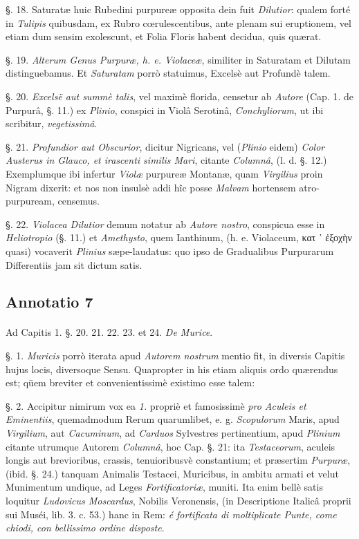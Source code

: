 \documentclass[a4paper, 11pt, oneside, polutonikogreek, german]{article}
\begin{document}
§. 18. Saturatæ huic Rubedini purpureæ opposita dein fuit \emph{Dilutior}: qualem forté in \emph{Tulipis} quibusdam, ex Rubro cœrulescentibus, ante plenam sui eruptionem, vel etiam dum sensim exolescunt, et Folia Floris habent decidua, quis quærat.

§. 19. \emph{Alterum Genus Purpuræ, h. e. Violaceæ}, similiter in Saturatam et Dilutam distinguebamus. Et \emph{Saturatam} porrò statuimus, Excelsè aut Profundè talem.

§. 20. \emph{Excelsë aut summè talis}, vel maximè florida, censetur ab \emph{Autore} (Cap. 1. de Purpurâ, §. 11.) ex \emph{Plinio}, conspici in Violâ Serotinâ, \emph{Conchyliorum}, ut ibi scribitur, \emph{vegetissimâ}.

§. 21. \emph{Profundior aut Obscurior}, dicitur Nigricans, vel (\emph{Plinio} eidem) \emph{Color Austerus in Glauco, et irascenti similis Mari}, citante \emph{Columnâ}, (l. d. §. 12.) Exemplumque ibi infertur \emph{Violæ} purpureæ Montanæ, quam \emph{Virgilius} proin Nigram dixerit: et nos non insulsè addi hîc posse \emph{Malvam} hortensem atro-purpuream, censemus.

§. 22. \emph{Violacea Dilutior} demum notatur ab \emph{Autore nostro}, conspicua esse in \emph{Heliotropio} (§. 11.) et \emph{Amethysto}, quem Ianthinum, (h. e. Violaceum, κατ ᾽ ἐξοχὴν quasi) vocaverit \emph{Plinius} sæpe-laudatus: quo ipso de Gradualibus Purpurarum Differentiis jam sit dictum satis.

\subsection{Annotatio 7}
\paragraph{}
Ad Capitis 1. §. 20. 21. 22. 23. et 24. \emph{De Murice}.

§. 1. \emph{Muricis} porrò iterata apud \emph{Autorem nostrum} mentio fit, in diversis Capitis hujus locis, diversoque Sensu. Quapropter in his etiam aliquis ordo quærendus est; qūem breviter et convenientissimè existimo esse talem:

§. 2. Accipitur nimirum vox ea \emph{1.} propriè et famosissimè \emph{pro Aculeis et Eminentiis}, quemadmodum Rerum quarumlibet, e. g. \emph{Scopulorum} Maris, apud \emph{Virgilium}, aut \emph{Cacuminum}, ad \emph{Carduos} Sylvestres pertinentium, apud \emph{Plinium} citante utrumque Autorem \emph{Columnâ}, hoc Cap. §. 21: ita \emph{Testaceorum}, aculeis longis aut brevioribus, crassis, tenuioribusvè constantium; et præsertim \emph{Purpuræ}, (ibid. §. 24.) tanquam Animalis Testacei, Muricibus, in ambitu armati et velut Munimentum undique, ad Leges \emph{Fortificatoriæ}, muniti. Ita enim bellè satis loquitur \emph{Ludovicus Moscardus}, Nobilis Veronensis, (in Descriptione Italicâ proprii sui Muséi, lib. 3. c. 53.) hanc in Rem: \emph{é fortificata di moltiplicate Punte, come chiodi, con bellissimo ordine disposte}.
\end{document}
